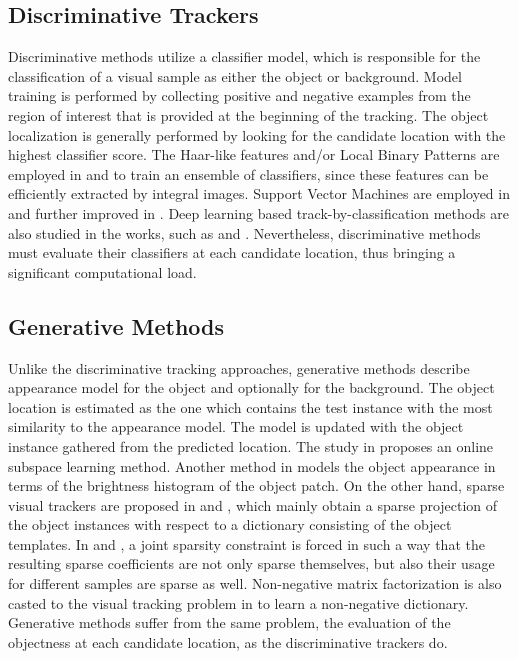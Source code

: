 \documentclass[journal]{IEEEtran}
\begin{document}
\subsection{Discriminative Trackers}
Discriminative methods utilize a classifier model, which is responsible for the classification of a visual sample as either the object or background. Model training is performed by collecting positive and negative examples from the region of interest that is provided at the beginning of the tracking. The object localization is generally performed by looking for the candidate location with the highest classifier score. The Haar-like features \cite{HAAR} and/or Local Binary Patterns \cite{LBP} are employed in \cite{MIL} and \cite{OAB} to train an ensemble of classifiers, since these features can be efficiently extracted by integral images. Support Vector Machines are employed in \cite{STRUCK} and further improved in \cite{StruckPart,DLSVM}. Deep learning based track-by-classification methods are also studied in the works, such as \cite{PorikliBMVC2} and \cite{MDNET}. Nevertheless, discriminative methods must evaluate their classifiers at each candidate location, thus bringing a significant computational load.
\subsection{Generative Methods}
Unlike the discriminative tracking approaches, generative methods describe appearance model for the object and optionally for the background. The object location is estimated as the one which contains the test instance with the most similarity to the appearance model. The model is updated with the object instance gathered from the predicted location. The study in \cite{IVT} proposes an online subspace learning method. Another method in \cite{KBOT} models the object appearance in terms of the brightness histogram of the object patch. On the other hand, sparse visual trackers are proposed in \cite{L1APG,L1Other,L1} and \cite{L1Other2}, which mainly obtain a sparse projection of the object instances with respect to a dictionary consisting of the object templates. In \cite{SparseMultiTask} and \cite{SparseLowRank}, a joint sparsity constraint is forced in such a way that the resulting sparse coefficients are not only sparse themselves, but also their usage for different samples are sparse as well. Non-negative matrix factorization is also casted to the visual tracking problem in \cite{NMF} to learn a non-negative dictionary. Generative methods suffer from the same problem, the evaluation of the objectness at each candidate location, as the discriminative trackers do.
\end{document}
